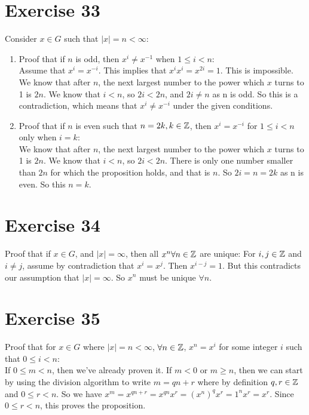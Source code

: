 \documentclass[12pt]{article}
\begin{document}
    \section*{Exercise 33}
    Consider $x \in G$ such that $|x| = n < \infty$:
    \begin{enumerate}[label=\textbf{\alph*.}]
        \item 
            Proof that if $n$ is odd,
            then $x^i \neq x^{-1}$ when $1 \leqslant i < n$: \\
            Assume that $x^i = x^{-i}$.
            This implies that $x^ix^i = x^{2i} = 1$.
            This is impossible. We know that after $n$, the next largest
            number to the power which $x$ turns to 1 is $2n$.
            We know that $i < n$,
            so $2i < 2n$,
            and $2i \neq n$ as n is odd.
            So this is a contradiction,
            which means that $x^i \neq x^{-i}$ under the given conditions. 
        \item 
            Proof that if $n$ is even such that $n = 2k, k \in \mathbb{Z}$,
            then $x^i = x^{-i}$ for $1 \leqslant i < n$ only when $i = k$: \\
            We know that after $n$, the next largest number to the power 
            which $x$ turns to 1 is $2n$.
            We know that $i < n$,
            so $2i < 2n$.
            There is only one number smaller than $2n$ for which the
            proposition holds, and that is $n$.
            So $2i = n = 2k$ as n is even.
            So this $n = k$.
    \end{enumerate}


    \section*{Exercise 34}
    Proof that if $x \in G$, and $|x| = \infty$,
    then all $x^n \forall n \in \mathbb{Z}$ are unique:
    For $i, j \in \mathbb{Z}$ and $i \neq j$, 
    assume by contradiction that $x^i = x^j$.
    Then $x^{i - j} = 1$.
    But this contradicts our assumption that $|x| = \infty$.
    So $x^n$ must be unique $\forall n$.


    \section*{Exercise 35}
    Proof that for $x \in G$ where $|x| = n < \infty$,
    $\forall n \in \mathbb{Z}$, $x^n = x^i$ for some integer $i$
    such that $0 \leqslant i < n$: \\
    If $0 \leqslant m < n$, then we've already proven it.
    If $m < 0$ or $m \geqslant n$,
    then we can start by using the division algorithm to write $m = qn + r$
    where by definition $q, r \in \mathbb{Z}$ and $0 \leqslant r < n$.
    So we have $x^m = x^{qn + r} = x^{qn}x^r = (x^n)^qx^r = 1^nx^r = x^r$.
    Since $0 \leqslant r < n$, this proves the proposition.
\end{document}
